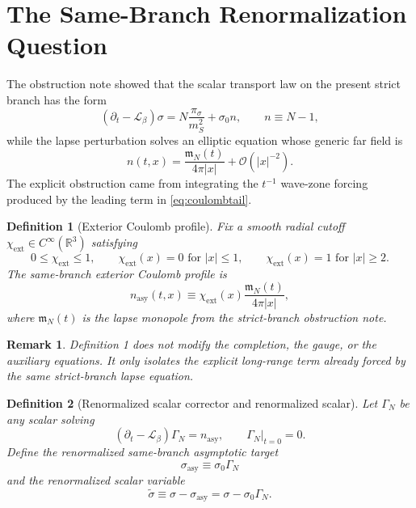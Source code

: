 \documentclass[11pt]{article}
\newcommand{\Ell}{\mathcal{L}}
\newtheorem{definition}{Definition}
\newtheorem{remark}{Remark}
\begin{document}
\section{The Same-Branch Renormalization Question}

The obstruction note showed that the scalar transport law on the present strict branch has the form
\begin{equation}
(\partial_t-\Ell_\beta)\sigma
=
N\frac{\pi_\sigma}{m_S^2}
+ \sigma_0 n,
\qquad
n\equiv N-1,
\label{eq:sigmaeq}
\end{equation}
while the lapse perturbation solves an elliptic equation whose generic far field is
\begin{equation}
n(t,x)=\frac{\mathfrak m_N(t)}{4\pi|x|}+\mathcal O(|x|^{-2}).
\label{eq:coulombtail}
\end{equation}
The explicit obstruction came from integrating the \(t^{-1}\) wave-zone forcing produced by the leading term in \eqref{eq:coulombtail}.

\begin{definition}[Exterior Coulomb profile]
Fix a smooth radial cutoff \(\chi_{\mathrm{ext}}\in C^\infty(\mathbb R^3)\) satisfying
\[
0\le \chi_{\mathrm{ext}}\le 1,
\qquad
\chi_{\mathrm{ext}}(x)=0 \text{ for } |x|\le 1,
\qquad
\chi_{\mathrm{ext}}(x)=1 \text{ for } |x|\ge 2.
\]
The \emph{same-branch exterior Coulomb profile} is
\begin{equation}
n_{\mathrm{asy}}(t,x)
\equiv
\chi_{\mathrm{ext}}(x)\frac{\mathfrak m_N(t)}{4\pi|x|},
\label{eq:nasy}
\end{equation}
where \(\mathfrak m_N(t)\) is the lapse monopole from the strict-branch obstruction note.
\end{definition}

\begin{remark}
Definition 1 does not modify the completion, the gauge, or the auxiliary equations. It only isolates the explicit long-range term already forced by the same strict-branch lapse equation.
\end{remark}

\begin{definition}[Renormalized scalar corrector and renormalized scalar]
Let \(\Gamma_N\) be any scalar solving
\begin{equation}
(\partial_t-\Ell_\beta)\Gamma_N
=
n_{\mathrm{asy}},
\qquad
\Gamma_N|_{t=0}=0.
\label{eq:Gamma}
\end{equation}
Define the \emph{renormalized same-branch asymptotic target}
\begin{equation}
\sigma_{\mathrm{asy}}\equiv \sigma_0\Gamma_N
\label{eq:sigmaasy}
\end{equation}
and the \emph{renormalized scalar variable}
\begin{equation}
\widetilde{\sigma}
\equiv
\sigma-\sigma_{\mathrm{asy}}
=
\sigma-\sigma_0\Gamma_N.
\label{eq:sigmatilde}
\end{equation}
\end{definition}
\end{document}
